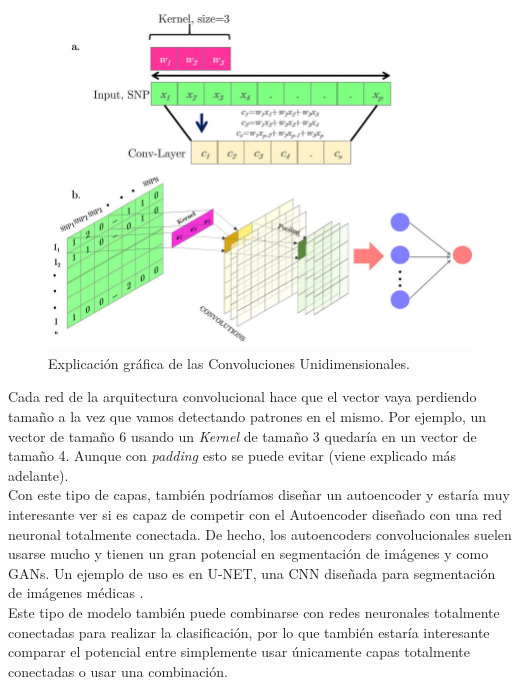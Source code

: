 \begin{figure}[H]
	\includegraphics[scale=0.3]{imagenes/03_Estado_del_arte/conv1d.png}
	\centering
	\caption{Explicación gráfica de las Convoluciones Unidimensionales.}
	\label{fig:conv1d}
\end{figure}

Cada red de la arquitectura convolucional hace que el vector vaya perdiendo tamaño a la vez que vamos detectando patrones en el mismo. Por ejemplo, un vector de tamaño 6 usando un \textit{Kernel} de tamaño 3 quedaría en un vector de tamaño 4. Aunque con \textit{padding} esto se puede evitar (viene explicado más adelante).\\

Con este tipo de capas, también podríamos diseñar un autoencoder y estaría muy interesante ver si es capaz de competir con el Autoencoder diseñado con una red neuronal totalmente conectada. De hecho, los autoencoders convolucionales suelen usarse mucho y tienen un gran potencial en segmentación de imágenes y como GANs. Un ejemplo de uso es en U-NET, una CNN diseñada para segmentación de imágenes médicas \cite{DBLP:journals/corr/RonnebergerFB15}.\\

Este tipo de modelo también puede combinarse con redes neuronales totalmente conectadas para realizar la clasificación, por lo que también estaría interesante comparar el potencial entre simplemente usar únicamente capas totalmente conectadas o usar una combinación.\\

